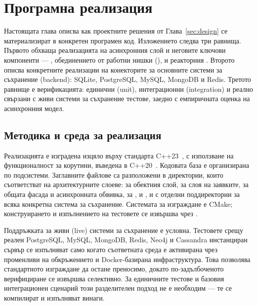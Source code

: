 \section{Програмна реализация}
\label{sec:implementation}

Настоящата глава описва как проектните решения от Глава~\ref{sec:design} се материализират в конкретен програмен код. Изложението следва три равнища. Първото обхваща реализацията на асинхронния слой и неговите ключови компоненти --- , обединението от работни нишки (),  и реакторния . Второто описва конкретните реализации на конекторите за основните системи за съхранение (backend): SQLite, PostgreSQL, MySQL, MongoDB и Redis. Третото равнище е верификацията: единични (unit), интеграционни (integration) и реално свързани с живи системи за съхранение тестове, заедно с емпиричната оценка на асинхронния модел.

\subsection{Методика и среда за реализация}
\label{subsec:method_environment}

Реализацията е изградена изцяло върху стандарта C++23~\cite{cpp23standard}, с използване на функционалност за корутини, въведена в C++20~\cite{cpp20standard,p0912r5,p1063r0}. Кодовата база е организирана по подсистеми. Заглавните файлове са разположени в директории, които съответстват на архитектурните слоеве:  за обектния слой,  за слоя на заявките,  за общата фасада и асинхронната обвивка,  за ,  и , и  с отделни поддиректории за всяка конкретна система за съхранение. Системата за изграждане е CMake; конструирането и изпълнението на тестовете се извършва чрез .

Поддръжката за живи (live) системи за съхранение е условна. Тестовете срещу реален PostgreSQL, MySQL, MongoDB, Redis, Neo4j и Cassandra инстанциран сървър се изпълняват само когато съответната среда е активирана чрез променливи на обкръжението и Docker-базирана инфраструктура. Това позволява стандартното изграждане да остане преносимо, докато по-задълбоченото верифициране се извършва селективно. За единичните тестове и базовия интеграционен сценарий този разделителен подход не е необходим --- те се компилират и изпълняват винаги.

